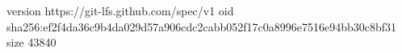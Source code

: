 version https://git-lfs.github.com/spec/v1
oid sha256:ef2f4da36c9b4da029d57a906cdc2cabb052f17c0a8996e7516e94bb30c8bf31
size 43840
